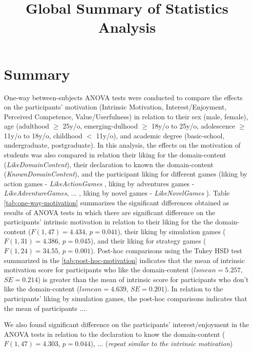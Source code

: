 \documentclass[6pt]{article}
\title{Global Summary of Statistics Analysis}
\begin{document}
\maketitle


\section{Summary}

One-way between-subjects ANOVA tests were conducted to compare the effects on the participants' motivation (Intrinsic Motivation, Interest/Enjoyment, Perceived Competence, Value/Userfulness) in relation to their sex (male, female), age (adulthood  $\geq$ 25y/o, emerging-dulhood $\geq$ 18y/o to 25y/o, adolescence $\geq$ 11y/o to 18y/o, childhood $<$ 11y/o),  and academic degree (basic-school, undergraduate, postgraduate). In this analysis, the effects on the motivation of students was also compared in relation their liking for the domain-content (\emph{LikeDomainContent}), their declaration to known the domain-content (\emph{KnownDomainContent}), and the participant liking for different games (liking by action games - \emph{LikeActionGames} , liking by adventures games - \emph{LikeAdventureGames}, ... , liking by novel games - \emph{LikeNovelGames} ). Table \ref{tab:one-way-motivation} summarizes the significant differences obtained as results of ANOVA tests in which there are significant difference on the participants' intrinsic motivation in relation to their liking for the the domain-content ($F(1,47) = 4.434$, $p = 0.041$), their liking by simulation games ($F(1,31) = 4.386$, $p = 0.045$), and their liking for strategy games ($F(1,24)=34.55$, $p=0.001$). Post-hoc comparisons using the Tukey HSD test summarized in the \ref{tab:post-hoc-motivation} indicates that the mean of intrinsic motivation score for participants who like the domain-content ($lsmean=5.257$, $SE=0.214$) is greater than the mean of intrinsic score for participants who don't like the domain-content ($lsmean=4.639$, $SE=0.201$). In relation to the participants' liking by simulation games, the post-hoc comparisons indicates that the mean of participants ....

We also found significant difference on the participants' interest/enjoyment in the ANOVA tests in relation to the declaration to know the domain-content ($F(1,47) = 4.303$, $p = 0.044$),  ... (\emph{repeat similar to the intrinsic motivation})

\newpage
\end{document}
